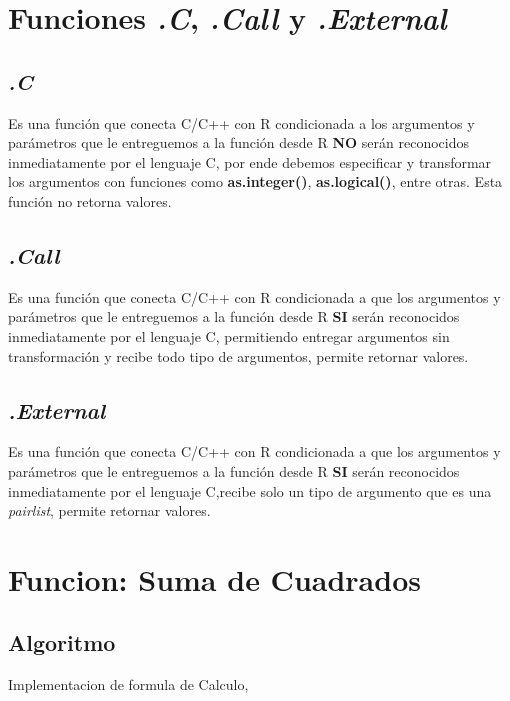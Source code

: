 \documentclass{article}
\begin{document}
    \section{Funciones \textit{.C}, \textit{.Call} y \textit{.External}}

    \subsection{\textit{.C}}
    
    Es una función que conecta C/C++ con R condicionada a los argumentos y parámetros que le entreguemos a la función desde R \textbf{NO} serán reconocidos inmediatamente por el lenguaje C, por ende debemos especificar y transformar los argumentos con funciones como \textbf{as.integer()}, \textbf{as.logical()}, entre otras. Esta función no retorna valores.
    
    \subsection{\textit{.Call}}
    
    Es una función que conecta C/C++ con R condicionada a que los argumentos y parámetros que le entreguemos a la función desde R \textbf{SI} serán reconocidos inmediatamente por el lenguaje C, permitiendo entregar argumentos sin transformación y recibe todo tipo de argumentos, permite retornar valores.
    
    \subsection{\textit{.External}}

    Es una función que conecta C/C++ con R condicionada a que los argumentos y parámetros que le entreguemos a la función desde R \textbf{SI} serán reconocidos inmediatamente por el lenguaje C,recibe solo un tipo de argumento que es una  \textit{pairlist}, permite retornar valores.

    \section{Funcion: Suma de Cuadrados}

    \subsection{Algoritmo}

    Implementacion de formula de Calculo,
\end{document}
